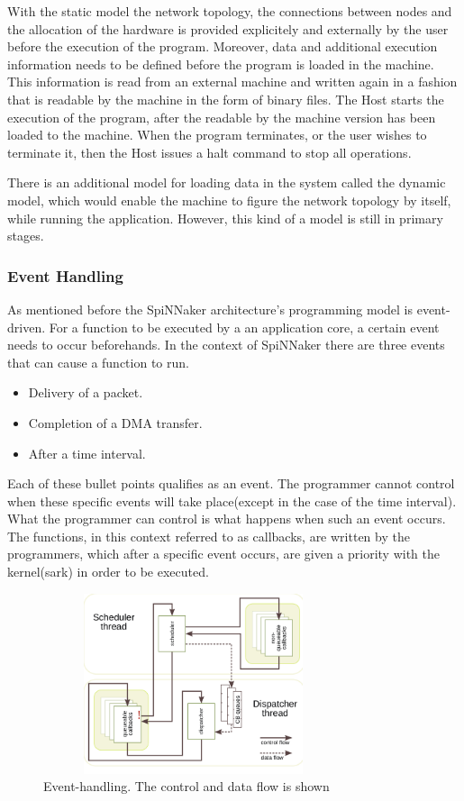 \documentclass[12pt,a4paper]{article}
\begin{document}
With the static model the network topology, the connections between nodes and the allocation of the hardware is provided explicitely and externally by the user before the execution of the program. Moreover, data and additional execution information needs to be defined before the program is loaded in the machine. This information is read from an external machine and written again in a fashion that is readable by the machine in the form of binary files. The Host starts the execution of the program, after the readable by the machine version has been loaded to the machine. When the program terminates, or the user wishes to terminate it, then the Host issues a halt command to stop all operations\cite{docfile}.

There is an additional model for loading data in the system called the dynamic model, which would enable the machine to figure the network topology by itself, while running the application. However, this kind of a model is still in primary stages\cite{docfile}.
\subsubsection{Event Handling}
As mentioned before the SpiNNaker architecture's programming model is event-driven. For a function to be executed by a an application core, a certain event needs to occur beforehands. In the context of SpiNNaker there are three events that can cause a function to run.
\begin{itemize}
\item Delivery of a packet.
\item Completion of a DMA transfer.
\item After a time interval.
\end{itemize}
Each of these bullet points qualifies as an event. The programmer cannot control when these specific events will take place(except in the case of the time interval). What the programmer can control is what happens when such an event occurs. The functions, in this context referred to as callbacks, are written by the programmers, which after a specific event occurs, are given a priority with the kernel(sark) in order to be executed. 
\begin{figure}[h!]
\includegraphics[width=250pt,height=150pt,scale=2]{Pics/event-handling.png}
\centering
\caption{Event-handling. The control and data flow is shown\cite{sharp2011event}}
\end{figure}
\end{document}
